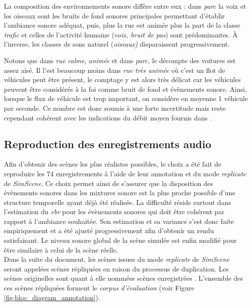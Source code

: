 La composition des environnements sonore diffère entre eux : dans \textit{parc} la voix et les oiseaux sont les bruits de fond sonores principales permettant d'établir l'ambiance sonore adéquat, puis, plus la rue est animée plus la part de la classe \textit{trafic} et celles de l'activité humaine (\textit{voix, bruit de pas}) sont prédominantes. À l'inverse, les classes de sons \og naturel \fg{} (\textit{oiseaux)} disparaissent progressivement.

Notons que dans \textit{rue calme}, \textit{animée} et dans \textit{parc}, le décompte des voitures est assez aisé. Il l'est beaucoup moins dans \textit{rue très animée} où c'est un flot de véhicules peut être présent, le comptage y est alors très délicat car les véhicules peuvent être considérés à la foi comme bruit de fond et évènements sonore. Ainsi, lorsque le flux de véhicule est trop important, on considère en moyenne 1 véhicule par seconde. Ce nombre est donc soumis à une forte incertitude mais reste cependant cohérent avec les indications du débit moyen fournis dans \cite{aumond2017modelling}.\\

\subsection{Reproduction des enregistrements audio}

Afin d'obtenir des scènes les plus réalistes possibles, le choix a été fait de reproduire les 74 enregistrements à l'aide de leur annotation et du mode \textit{replicate} de \textit{SimScene}. Ce choix permet ainsi de s'assurer que la disposition des évènements sonores dans les mixtures sonore est la plus proche possible d'une structure temporelle ayant déjà été réalisée. La difficulté réside surtout dans l'estimation du \textit{ebr} pour les évènements sonores qui doit être cohérent par rapport à l'ambiance souhaitée. Son estimation et sa variance s'est donc faite empiriquement et a été ajusté progressivement afin d'obtenir un rendu satisfaisant. Le niveau sonore global de la scène simulée est enfin modifié pour être similaire à celui de la scène réelle.\\

Dans la suite du document, les scènes issues du mode \textit{replicate} de \textit{SimScene} seront appelées \og scènes répliquées \fg{} en raison du processus de duplication. Les scènes originelles sont quant à elle nommées \og scènes enregistrées \fg{}. L'ensemble des ces scènes répliquées forment le \textit{corpus d'évaluation} (voir Figure \ref{fig:bloc_diagram_annotation}).\\

